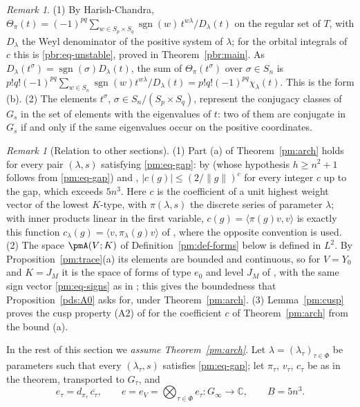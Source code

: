 \documentclass[10pt]{amsart}
\theoremstyle{definition}
\theoremstyle{remark}
\newtheorem{remark}[theorem]{Remark}
\newcommand{\C}{\mathbb C}
\providecommand{\auPl}{\Phi}
\providecommand{\aubar}[1]{\overline{#1}}
\begin{document}
\begin{remark}\label{pm:rem-arch}
(1) By Harish-Chandra, $\Theta_\pi(t)=(-1)^{pq}\sum_{w\in S_p\times S_q}\operatorname{sgn}(w)\,
t^{w\lambda}/D_\lambda(t)$ on the regular set of $T$, with $D_\lambda$ the Weyl denominator of the
positive system of $\lambda$; for the orbital integrals of $c$ this is \eqref{pbr:eq-unstable},
proved in Theorem~\ref{pbr:main}. As $D_\lambda(t^\sigma)=\operatorname{sgn}(\sigma)D_\lambda(t)$, the sum
of $\Theta_\pi(t^\sigma)$ over $\sigma\in S_n$ is $p!q!(-1)^{pq}\sum_{w\in S_n}\operatorname{sgn}(w)
t^{w\lambda}/D_\lambda(t)=p!q!(-1)^{pq}\chi_\lambda(t)$. This is the form (b). (2) The elements
$t^\sigma$, $\sigma\in S_n/(S_p\times S_q)$, represent the conjugacy classes of $G_s$ in the set of
elements with the eigenvalues of $t$: two of them are conjugate in $G_s$ if and only if the same
eigenvalues occur on the positive coordinates.
\end{remark}

\begin{remark}[Relation to other sections]\label{pm:rem-other}
(1) Part (a) of Theorem~\ref{pm:arch} holds for every pair $(\lambda,s)$ satisfying
\eqref{pm:eq-gap}: by {\cite[Theorem~3.17]{P49}} (whose hypothesis $h\ge n^2+1$ follows from
\eqref{pm:eq-gap}) and {\cite[Lemma~3.25]{P49}}, $|c(g)|\le(2/\|g\|)^{c}$ for every integer $c$ up to the
gap, which exceeds $5n^3$. Here $c$ is the coefficient of a unit highest weight vector of the lowest
$K$-type, with $\pi(\lambda,s)$ the discrete series of parameter $\lambda$; with inner products
linear in the first variable, $c(g)=\langle\pi(g)v,v\rangle$ is exactly this function $c_\lambda(g)=
\langle v,\pi_\lambda(g)v\rangle$ of {\cite[\S3.2]{P49}}, where the opposite convention is used.
(2) The space $\pmA(V;K)$ of Definition~\ref{pm:def-forms} below is defined in $L^2$. By
Proposition~\ref{pm:trace}(a) its elements are bounded and continuous, so for $V=Y_0$ and $K=J_M$
it is the space of forms of type $e_0$ and level $J_M$ of {\cite[Definition~8.1]{P49}}, with the
same sign vector \eqref{pm:eq-signs} as in {\cite[(74)]{P49}}; this gives the boundedness that
Proposition~\ref{pds:A0} asks for, under Theorem~\ref{pm:arch}. (3) Lemma~\ref{pm:cusp} proves
the cusp property (A2) of {\cite[\S8.1]{P49}} for the coefficient $c$ of Theorem~\ref{pm:arch} from
the bound (a).
\end{remark}

In the rest of this section we \emph{assume Theorem~\ref{pm:arch}}. Let $\lambda=(\lambda_\tau)_{
\tau\in\auPl}$ be parameters such that every $(\lambda_\tau,s)$ satisfies \eqref{pm:eq-gap}; let
$\pi_\tau$, $v_\tau$, $c_\tau$ be as in the theorem, transported to $G_\tau$, and
\begin{equation}\label{pm:eq-e}
e_\tau=d_{\pi_\tau}\,\aubar{c_\tau},\qquad e=e_V=\bigotimes_{\tau\in\auPl}e_\tau\colon G_\infty\to\C,
\qquad B=5n^3 .
\end{equation}
\end{document}
